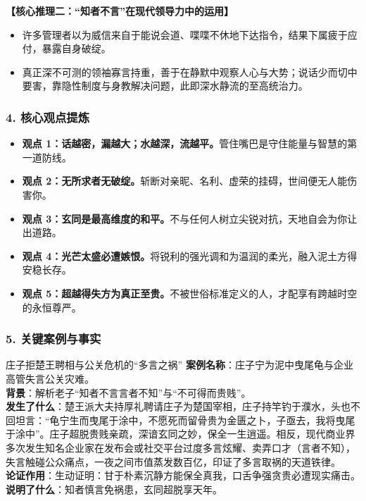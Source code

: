 \noindent\textbf{【核心推理二：“知者不言”在现代领导力中的运用】}
\begin{itemize}
    \item 许多管理者以为威信来自于能说会道、喋喋不休地下达指令，结果下属疲于应付，暴露自身破绽。
    \item 真正深不可测的领袖寡言持重，善于在静默中观察人心与大势；说话少而切中要害，靠隐性制度与身教解决问题，此即深水静流的至高统治力。
\end{itemize}

\subsubsection{4. 核心观点提炼}
\begin{itemize}
    \item \textbf{观点 1：话越密，漏越大；水越深，流越平。}管住嘴巴是守住能量与智慧的第一道防线。
    \item \textbf{观点 2：无所求者无破绽。}斩断对亲昵、名利、虚荣的挂碍，世间便无人能伤害你。
    \item \textbf{观点 3：玄同是最高维度的和平。}不与任何人树立尖锐对抗，天地自会为你让出道路。
    \item \textbf{观点 4：光芒太盛必遭嫉恨。}将锐利的强光调和为温润的柔光，融入泥土方得安稳长存。
    \item \textbf{观点 5：超越得失方为真正至贵。}不被世俗标准定义的人，才配享有跨越时空的永恒尊严。
\end{itemize}

\subsubsection{5. 关键案例与事实}
\begin{CaseBox}{庄子拒楚王聘相与公关危机的“多言之祸”}
\textbf{案例名称}：庄子宁为泥中曳尾龟与企业高管失言公关灾难。\\
\textbf{背景}：解析老子“知者不言言者不知”与“不可得而贵贱”。\\
\textbf{发生了什么}：楚王派大夫持厚礼聘请庄子为楚国宰相，庄子持竿钓于濮水，头也不回坦言：“龟宁生而曳尾于涂中，不愿死而留骨贵为金匮之卜，子亟去，我将曳尾于涂中”。庄子超脱贵贱亲疏，深谙玄同之妙，保全一生逍遥。相反，现代商业界多次发生知名企业家在发布会或社交平台过度多言炫耀、卖弄口才（言者不知），失言触碰公众痛点，一夜之间市值蒸发数百亿，印证了多言取祸的天道铁律。\\
\textbf{论证作用}：生动证明：甘于朴素沉静方能保全真我，口舌争强贪贵必遭现实痛击。\\
\textbf{说明了什么}：知者慎言免祸患，玄同超脱享天年。
\end{CaseBox}

